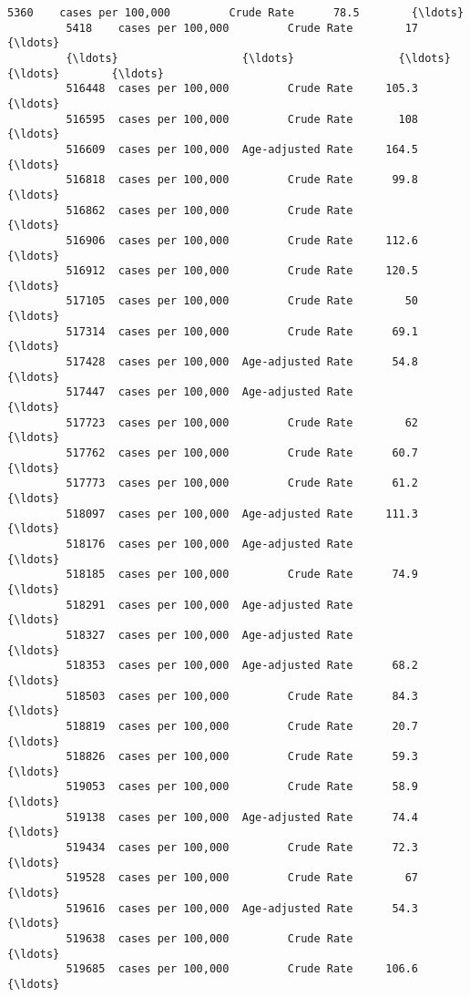 \documentclass[11pt]{article}
\begin{document}
\begin{Verbatim}[commandchars=\\\{\}]
         5360    cases per 100,000         Crude Rate      78.5        {\ldots}          
         5418    cases per 100,000         Crude Rate        17        {\ldots}          
         {\ldots}                   {\ldots}                {\ldots}       {\ldots}        {\ldots}          
         516448  cases per 100,000         Crude Rate     105.3        {\ldots}          
         516595  cases per 100,000         Crude Rate       108        {\ldots}          
         516609  cases per 100,000  Age-adjusted Rate     164.5        {\ldots}          
         516818  cases per 100,000         Crude Rate      99.8        {\ldots}          
         516862  cases per 100,000         Crude Rate                  {\ldots}          
         516906  cases per 100,000         Crude Rate     112.6        {\ldots}          
         516912  cases per 100,000         Crude Rate     120.5        {\ldots}          
         517105  cases per 100,000         Crude Rate        50        {\ldots}          
         517314  cases per 100,000         Crude Rate      69.1        {\ldots}          
         517428  cases per 100,000  Age-adjusted Rate      54.8        {\ldots}          
         517447  cases per 100,000  Age-adjusted Rate                  {\ldots}          
         517723  cases per 100,000         Crude Rate        62        {\ldots}          
         517762  cases per 100,000         Crude Rate      60.7        {\ldots}          
         517773  cases per 100,000         Crude Rate      61.2        {\ldots}          
         518097  cases per 100,000  Age-adjusted Rate     111.3        {\ldots}          
         518176  cases per 100,000  Age-adjusted Rate                  {\ldots}          
         518185  cases per 100,000         Crude Rate      74.9        {\ldots}          
         518291  cases per 100,000  Age-adjusted Rate                  {\ldots}          
         518327  cases per 100,000  Age-adjusted Rate                  {\ldots}          
         518353  cases per 100,000  Age-adjusted Rate      68.2        {\ldots}          
         518503  cases per 100,000         Crude Rate      84.3        {\ldots}          
         518819  cases per 100,000         Crude Rate      20.7        {\ldots}          
         518826  cases per 100,000         Crude Rate      59.3        {\ldots}          
         519053  cases per 100,000         Crude Rate      58.9        {\ldots}          
         519138  cases per 100,000  Age-adjusted Rate      74.4        {\ldots}          
         519434  cases per 100,000         Crude Rate      72.3        {\ldots}          
         519528  cases per 100,000         Crude Rate        67        {\ldots}          
         519616  cases per 100,000  Age-adjusted Rate      54.3        {\ldots}          
         519638  cases per 100,000         Crude Rate                  {\ldots}          
         519685  cases per 100,000         Crude Rate     106.6        {\ldots}          
         

\end{Verbatim}
\end{document}

